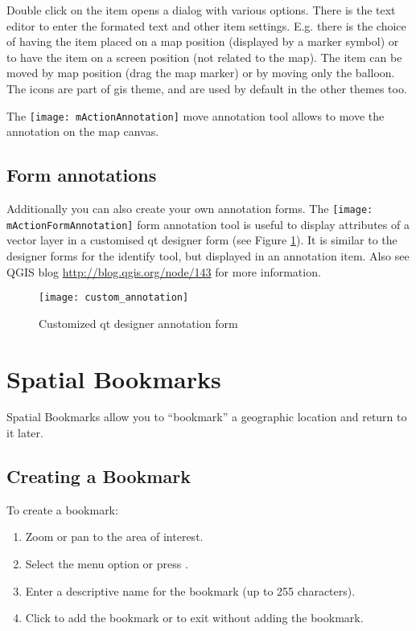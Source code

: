 Double click on the item opens a dialog with various options. There is the
text editor to enter the formated text and other item settings. E.g. there
is the choice of having the item placed on a map position (displayed by
a marker symbol) or to have the item on a screen position (not related
to the map). The item can be moved by map position (drag the map marker)
or by moving only the balloon. The icons are part of gis theme, and are used
by default in the other themes too.

The \texttt{[image: mActionAnnotation]} move annotation
tool allows to move the annotation on the map canvas.

\subsection{Form annotations}

Additionally you can also create your own annotation forms. The
\texttt{[image: mActionFormAnnotation]} form annotation
tool is useful to display attributes of a vector layer in a customised qt
designer form (see Figure \ref{fig:custom-annotations}). It is similar to the
designer forms for the identify tool, but displayed in an annotation item.
Also see QGIS blog \url{http://blog.qgis.org/node/143} for more information.

\begin{figure}[ht]
   \centering
   \texttt{[image: custom\_annotation]}
   \caption{Customized qt designer annotation form \nixcaption}
   \label{fig:custom-annotations}
\end{figure}

\newpage

\section{Spatial Bookmarks}\label{sec:bookmarks}

Spatial Bookmarks allow you to ``bookmark'' a geographic location and return to it later.

\subsection{Creating a Bookmark}
To create a bookmark:
\begin{enumerate}
\item Zoom or pan to the area of interest.
\item Select the menu option  \arrow {} or press .
\item Enter a descriptive name for the bookmark (up to 255 characters).
\item Click  to add the bookmark or  to exit without adding the bookmark.
\end{enumerate}

